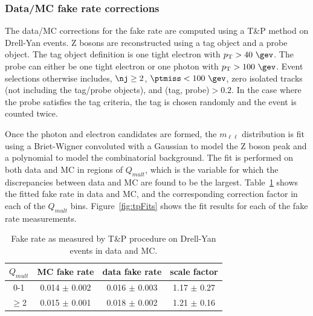 \subsubsection{Data/MC fake rate corrections}

The data/MC corrections for the fake rate are computed using a T\&P method on 
Drell-Yan events.  Z bosons are reconstructed using a tag object and a probe object.    
The tag object definition is one tight electron with $\pt>40~\gev$.  The probe
can either be one tight electron or one photon with $\pt>100~\gev$. Event selections
otherwise includes, $\nj\geq2$, $\ptmiss<100~\gev$, zero isolated tracks 
(not including the tag/probe objects), and \dR(tag, probe)$>0.2$. 
In the case where the probe satisfies the tag criteria, the tag is chosen
randomly and the event is counted twice. 

Once the photon and electron candidates are formed, the $m_{\ell\ell}$ distribution
is fit using a Briet-Wigner convoluted with a Gaussian to model the Z boson peak and
a polynomial to model the combinatorial background.  The fit is performed on 
both data and MC in regions of $Q_{mult}$, which is the variable for which 
the discrepancies between data and MC are found to be the largest. Table~\ref{tab:fakeRateCorrections}
shows the fitted fake rate in data and MC, and the corresponding correction
factor in each of the $Q_{mult}$ bins. Figure~\ref{fig:tpFits} shows the 
fit results for each of the fake rate measurements.

\begin{table}[h!]
\centering
\caption[Fake rate SFs]{Fake rate as measured by T\&P procedure on Drell-Yan events in data and MC.}
\label{tab:fakeRateCorrections}
\begin{tabular}{c|c|c|c}
\hline
$Q_{mult}$ & MC fake rate    & data fake rate  & scale factor \\ \hline\hline

0-1        & 0.014 $\pm$ 0.002    & 0.016 $\pm$ 0.003    & 1.17 $\pm$ 0.27  \\ \hline
$\geq$2    & 0.015 $\pm$ 0.001    & 0.018 $\pm$ 0.002    & 1.21 $\pm$ 0.16  \\ \hline
\end{tabular}
\end{table}


